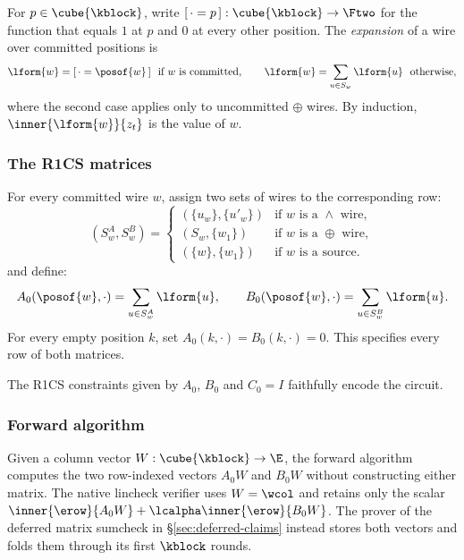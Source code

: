 For $p\in\cube{\kblock}$, write $[\,\cdot=p\,]:\cube{\kblock}\to\Ftwo$ for the function that equals $1$ at $p$ and $0$ at every other position. The \emph{expansion} of a wire over committed positions is
\begin{equation}\label{flock:eq:expand}
\lform{w}=[\,\cdot=\posof{w}\,]\ \text{ if $w$ is committed},\qquad \lform{w}=\sum_{u\in S_w}\lform{u}\ \text{ otherwise},
\end{equation}
where the second case applies only to uncommitted $\oplus$ wires. By induction, $\inner{\lform{w}}{z_t}$ is the value of $w$.

\subsubsection{The R1CS matrices}\label{flock:rows}

For every committed wire $w$, assign two sets of wires to the corresponding row:
\[
(S^A_w,S^B_w)=
\begin{cases}
(\{u_w\},\{u'_w\}) & \text{if $w$ is a $\wedge$ wire},\\
(S_w,\{w_1\}) & \text{if $w$ is a $\oplus$ wire},\\
(\{w\},\{w_1\}) & \text{if $w$ is a source}.
\end{cases}
\]
and define:
\begin{equation}\label{flock:eq:row-lists}
A_0(\posof{w},\cdot)=\sum_{u\in S^A_w}\lform{u},\qquad B_0(\posof{w},\cdot)=\sum_{u\in S^B_w}\lform{u}.
\end{equation}
For every empty position $k$, set $A_0(k,\cdot)=B_0(k,\cdot)=0$. This specifies every row of both matrices.

\vspace{3mm}

The R1CS constraints given by $A_0$, $B_0$ and $C_0=I$ faithfully encode the circuit.
\subsubsection{Forward algorithm}\label{flock:forward}

Given a column vector $W:\cube{\kblock}\to\E$, the forward algorithm computes the two row-indexed vectors $A_0W$ and $B_0W$ without constructing either matrix. The native lincheck verifier uses $W=\wcol$ and retains only the scalar $\inner{\erow}{A_0W}+\lcalpha\inner{\erow}{B_0W}$. The prover of the deferred matrix sumcheck in \S\ref{sec:deferred-claims} instead stores both vectors and folds them through its first $\kblock$ rounds.

